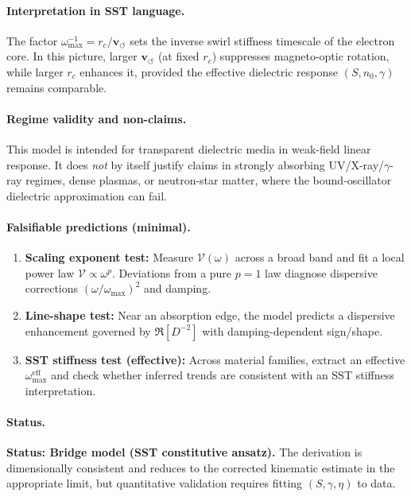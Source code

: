 \documentclass[10pt]{article}
\begin{document}
        \paragraph{Interpretation in SST language.}
            The factor \(\omega_{\max}^{-1}=r_c/\mathbf{v}_{\!\boldsymbol{\circlearrowleft}}\) sets the inverse swirl stiffness timescale of the electron core. In this picture, larger \(\mathbf{v}_{\!\boldsymbol{\circlearrowleft}}\) (at fixed \(r_c\)) suppresses magneto-optic rotation, while larger \(r_c\) enhances it, provided the effective dielectric response \((S,n_0,\gamma)\) remains comparable.

        \paragraph{Regime validity and non-claims.}
            This model is intended for transparent dielectric media in weak-field linear response. It does \emph{not} by itself justify claims in strongly absorbing UV/X-ray/\(\gamma\)-ray regimes, dense plasmas, or neutron-star matter, where the bound-oscillator dielectric approximation can fail.
        
        \paragraph{Falsifiable predictions (minimal).}
            \begin{enumerate}
                \item \textbf{Scaling exponent test:} Measure \(\mathcal{V}(\omega)\) across a broad band and fit a local power law \(\mathcal{V}\propto \omega^p\). Deviations from a pure \(p=1\) law diagnose dispersive corrections \((\omega/\omega_{\max})^2\) and damping.
                \item \textbf{Line-shape test:} Near an absorption edge, the model predicts a dispersive enhancement governed by \(\Re[D^{-2}]\) with damping-dependent sign/shape.
                \item \textbf{SST stiffness test (effective):} Across material families, extract an effective \(\omega_{\max}^{\mathrm{eff}}\) and check whether inferred trends are consistent with an SST stiffness interpretation.
            \end{enumerate}
        
        \paragraph{Status.}
            \textbf{Status: Bridge model (SST constitutive ansatz).}
            The derivation is dimensionally consistent and reduces to the corrected kinematic estimate in the appropriate limit, but quantitative validation requires fitting \((S,\gamma,\eta)\) to data.
        
\end{document}

